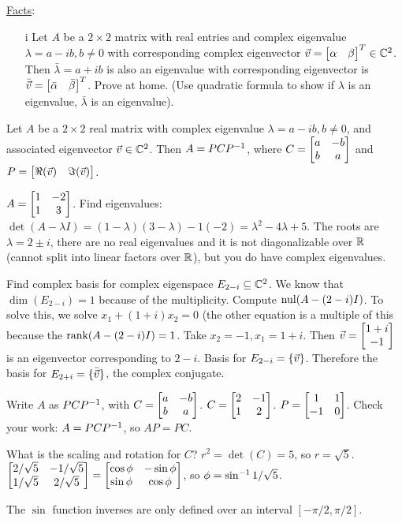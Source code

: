 \documentclass[10pt,a4paper]{article}
\begin{document}
\underline{Facts}:
\begin{enumerate}
	\item[i] Let $A$ be a $2\times 2$ matrix with real entries and complex eigenvalue $\lambda = a-ib,b\neq 0$ with corresponding complex eigenvector $\vec{v} =\begin{bmatrix}\alpha & \beta\end{bmatrix}^T \in \mathbb{C}^2$. Then $\bar \lambda = a + ib$ is also an eigenvalue with corresponding eigenvector is $\bar {\vec{v}} = \begin{bmatrix}\bar \alpha & \bar \beta\end{bmatrix}^T$. Prove at home. (Use quadratic formula to show if $\lambda$ is an eigenvalue, $\bar \lambda$ is an eigenvalue).
\end{enumerate}
\begin{theorem}
	Let $A$ be a $2\times 2$ real matrix with complex eigenvalue $\lambda = a-ib,b\neq 0$, and associated eigenvector $\vec{v} \in \mathbb{C}^2$.
	Then $A = PCP^{-1}$, where $C = \begin{bmatrix}a & -b \\ b & a\end{bmatrix}$ and $P = \begin{bmatrix}\Re(\vec{v}) & \Im(\vec{v})\end{bmatrix}$.
\end{theorem}
\begin{example}
	$A = \begin{bmatrix}1 & -2 \\ 1 & 3\end{bmatrix}$. Find eigenvalues: $\det(A - \lambda I) = (1-\lambda)(3-\lambda) - 1(-2) = \lambda^2 - 4 \lambda + 5$. The roots are $\lambda = 2 \pm i$, there are no real eigenvalues and it is not diagonalizable over $\mathbb{R}$ (cannot split into linear factors over $\mathbb{R}$), but you do have complex eigenvalues.
	
	Find complex basis for complex eigenspace $E_{2-i} \subseteq \mathbb{C}^2$. We know that $\dim(E_{2-i}) = 1$ because of the multiplicity.
	Compute $\text{nul}(A-(2-i)I)$.
	To solve this, we solve $x_1 + (1+i)x_2 = 0$ (the other equation is a multiple of this because the $\text{rank}(A-(2-i)I) = 1$. Take $x_2 = -1, x_1 = 1+i$. Then $\vec{v} = \begin{bmatrix}1+i \\ -1\end{bmatrix}$ is an eigenvector corresponding to $2-i$. Basis for $E_{2-i} = \{\vec{v}\}$. Therefore the basis for $E_{2+i} = \{\bar {\vec{v}} \}$, the complex conjugate.
	
	Write $A$ as $PCP^{-1}$, with $C = \begin{bmatrix}a & -b \\ b & a\end{bmatrix}$. $C = \begin{bmatrix}2 & -1 \\ 1 & 2\end{bmatrix}$. $P = \begin{bmatrix}1 & 1 \\ -1 & 0\end{bmatrix}$. Check your work: $A = PCP^{-1}$, so $AP = PC$.
	
	What is the scaling and rotation for $C$? $r^2 = \det(C) = 5$, so $r = \sqrt{5}$. $\begin{bmatrix}2/\sqrt{5} & -1/\sqrt{5} \\ 1/\sqrt{5} & 2/\sqrt{5}\end{bmatrix} = \begin{bmatrix}\cos\phi & -\sin\phi \\ \sin\phi & \cos\phi\end{bmatrix}$, so $\phi = \sin^{-1} 1/\sqrt{5}$.
\end{example}
\begin{recall}
	The $\sin$ function inverses are only defined over an interval $[-\pi/2,\pi/2]$.
\end{recall}
\end{document}
